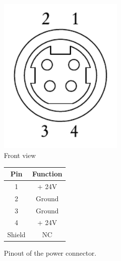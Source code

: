 \begin{figure}[h]
\begin{center}
\begin{minipage}[h]{0.49\textwidth}
    \centering
    \includegraphics[width=0.55\textwidth]{grafiken/R7B.pdf}\\
    Front view
  \end{minipage}
  \hfill
  \begin{minipage}[h]{0.49\textwidth}
    \centering
    \begin{tabular}{cc}
      \toprule
      \textbf{Pin} & \textbf{Function} \\
      \toprule
      1 & + 24V \\ \midrule
      2 & Ground\\ \midrule
      3 & Ground \\ \midrule
      4 & + 24V  \\ \midrule
      Shield & NC \\
      \bottomrule
    \end{tabular}
  \end{minipage}
\end{center}
\caption[Pinout of the power connector.]{Pinout of the power connector.}
\label{pin_out_power}
\end{figure}






